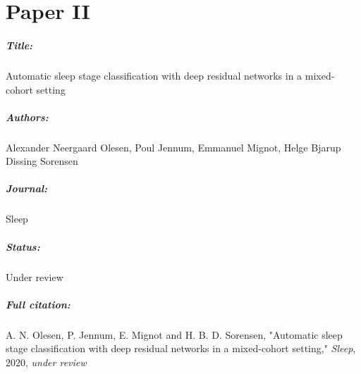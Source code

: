 \chapter{Paper II}

\paragraph{Title:}
Automatic sleep stage classification with deep residual networks in a mixed-cohort setting

\paragraph{Authors:}
Alexander Neergaard Olesen, Poul Jennum, Emmanuel Mignot, Helge Bjarup Dissing Sorensen

\paragraph{Journal:}
Sleep

\paragraph{Status:}
Under review

\paragraph{Full citation:}
A. N. Olesen, P. Jennum, E. Mignot and H. B. D. Sorensen, "Automatic sleep stage classification with deep residual networks in a mixed-cohort setting," \textit{Sleep}, 2020, \textit{under review}


